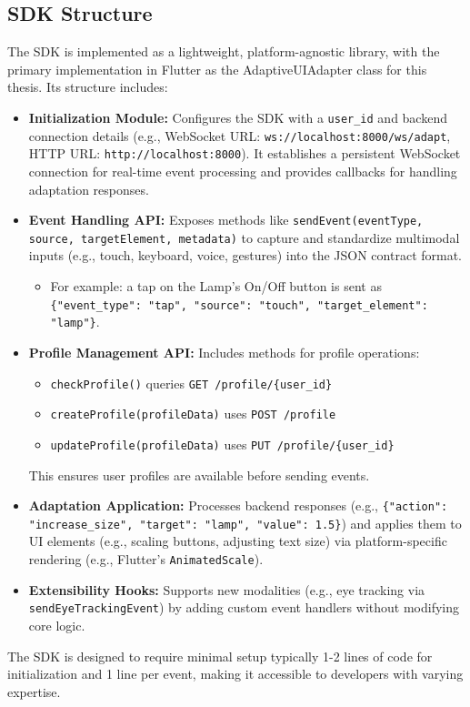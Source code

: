 \documentclass[openany]{book}
\begin{document}
\subsection{SDK Structure}
The SDK is implemented as a lightweight, platform-agnostic library, with the primary implementation in Flutter as the AdaptiveUIAdapter class for this thesis. Its structure includes:
\begin{itemize}
    \item \textbf{Initialization Module:} Configures the SDK with a \texttt{user\_id} and backend connection details (e.g., WebSocket URL: \texttt{ws://localhost:8000/ws/adapt}, HTTP URL: \texttt{http://localhost:8000}). It establishes a persistent WebSocket connection for real-time event processing and provides callbacks for handling adaptation responses.
    \item \textbf{Event Handling API:} Exposes methods like \texttt{sendEvent(eventType, source, targetElement, metadata)} to capture and standardize multimodal inputs (e.g., touch, keyboard, voice, gestures) into the JSON contract format.
    \begin{itemize}
        \item For example: a tap on the Lamp’s On/Off button is sent as \texttt{\{"event\_type": "tap", "source": "touch", "target\_element": "lamp"\}}.
    \end{itemize}
    \item \textbf{Profile Management API:} Includes methods for profile operations:
    \begin{itemize}
        \item \texttt{checkProfile()} queries \texttt{GET /profile/\{user\_id\}}
        \item \texttt{createProfile(profileData)} uses \texttt{POST /profile}
        \item \texttt{updateProfile(profileData)} uses \texttt{PUT /profile/\{user\_id\}}
    \end{itemize}
    This ensures user profiles are available before sending events.
    \item \textbf{Adaptation Application:} Processes backend responses (e.g., \texttt{\{"action": "increase\_size", "target": "lamp", "value": 1.5\}}) and applies them to UI elements (e.g., scaling buttons, adjusting text size) via platform-specific rendering (e.g., Flutter’s \texttt{AnimatedScale}).
    \item \textbf{Extensibility Hooks:} Supports new modalities (e.g., eye tracking via \texttt{sendEyeTrackingEvent}) by adding custom event handlers without modifying core logic.
\end{itemize}
The SDK is designed to require minimal setup typically 1-2 lines of code for initialization and 1 line per event, making it accessible to developers with varying expertise.
\end{document}

